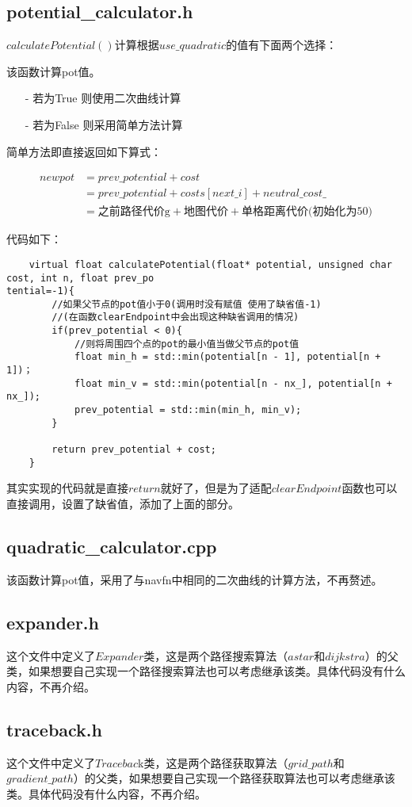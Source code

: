 \documentclass[9pt, oneside]{book}
\begin{document}
\subsection{potential\_calculator.h}

$calculatePotential()$计算根据$use\_quadratic$的值有下面两个选择：

该函数计算pot值。

\begin{itemize}
    \item [-] 若为True  则使用二次曲线计算
    \item [-] 若为False 则采用简单方法计算
\end{itemize}

简单方法即直接返回如下算式： 

\begin{equation}
    \begin{aligned}
        new pot &= prev\_potential + cost\\
                &= prev\_potential + costs[next\_i] + neutral\_cost\_\\
                &= \mbox{之前路径代价g} + \mbox{地图代价} + \mbox{单格距离代价(初始化为50)}
    \end{aligned}
\end{equation}

代码如下：

\small
\begin{verbatim}
    virtual float calculatePotential(float* potential, unsigned char cost, int n, float prev_po
tential=-1){
        //如果父节点的pot值小于0(调用时没有赋值 使用了缺省值-1)
        //(在函数clearEndpoint中会出现这种缺省调用的情况)
        if(prev_potential < 0){
            //则将周围四个点的pot的最小值当做父节点的pot值
            float min_h = std::min(potential[n - 1], potential[n + 1])；
            float min_v = std::min(potential[n - nx_], potential[n + nx_]);
            prev_potential = std::min(min_h, min_v);
        }

        return prev_potential + cost;
    }
\end{verbatim}
\normalsize

其实实现的代码就是直接$return$就好了，但是为了适配$clearEndpoint$函数也可以直接调用，设置了缺省值，添加了上面的部分。

\subsection{quadratic\_calculator.cpp}

该函数计算pot值，采用了与navfn中相同的二次曲线的计算方法，不再赘述。

\subsection{expander.h}

这个文件中定义了$Expander$类，这是两个路径搜索算法（$astar$和$dijkstra$）的父类，如果想要自己实现一个路径搜索算法也可以考虑继承该类。具体代码没有什么内容，不再介绍。

\subsection{traceback.h}

这个文件中定义了$Tracebac$k类，这是两个路径获取算法（$grid\_path$和$gradient\_path$）的父类，如果想要自己实现一个路径获取算法也可以考虑继承该类。具体代码没有什么内容，不再介绍。
\end{document}
